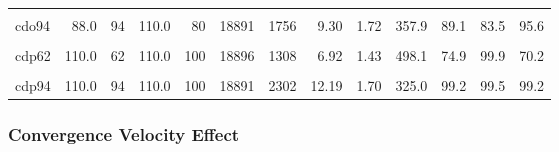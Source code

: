 \begin{landscape}
\begin{longtable}[t]{lrrrrrrrrrrrr}
\cellcolor{gray!6}{cdo78} & \cellcolor{gray!6}{88.0} & \cellcolor{gray!6}{78} & \cellcolor{gray!6}{110.0} & \cellcolor{gray!6}{80} & \cellcolor{gray!6}{18891} & \cellcolor{gray!6}{1557} & \cellcolor{gray!6}{8.24} & \cellcolor{gray!6}{1.41} & \cellcolor{gray!6}{454.2} & \cellcolor{gray!6}{72.4} & \cellcolor{gray!6}{99.9} & \cellcolor{gray!6}{65.3}\\
cdo94 & 88.0 & 94 & 110.0 & 80 & 18891 & 1756 & 9.30 & 1.72 & 357.9 & 89.1 & 83.5 & 95.6\\
\cellcolor{gray!6}{cdp46} & \cellcolor{gray!6}{110.0} & \cellcolor{gray!6}{46} & \cellcolor{gray!6}{110.0} & \cellcolor{gray!6}{100} & \cellcolor{gray!6}{18891} & \cellcolor{gray!6}{1390} & \cellcolor{gray!6}{7.36} & \cellcolor{gray!6}{1.30} & \cellcolor{gray!6}{614.9} & \cellcolor{gray!6}{59.8} & \cellcolor{gray!6}{99.3} & \cellcolor{gray!6}{34.6}\\
cdp62 & 110.0 & 62 & 110.0 & 100 & 18896 & 1308 & 6.92 & 1.43 & 498.1 & 74.9 & 99.9 & 70.2\\
\cellcolor{gray!6}{cdp78} & \cellcolor{gray!6}{110.0} & \cellcolor{gray!6}{78} & \cellcolor{gray!6}{110.0} & \cellcolor{gray!6}{100} & \cellcolor{gray!6}{18891} & \cellcolor{gray!6}{1716} & \cellcolor{gray!6}{9.09} & \cellcolor{gray!6}{1.46} & \cellcolor{gray!6}{536.4} & \cellcolor{gray!6}{68.0} & \cellcolor{gray!6}{99.9} & \cellcolor{gray!6}{64.4}\\
cdp94 & 110.0 & 94 & 110.0 & 100 & 18891 & 2302 & 12.19 & 1.70 & 325.0 & 99.2 & 99.5 & 99.2\\*
\end{longtable}
\endgroup{}
\end{landscape}

\endgroup

\hypertarget{convergence-velocity-effect}{%
\subsubsection{Convergence Velocity Effect}\label{convergence-velocity-effect}}

